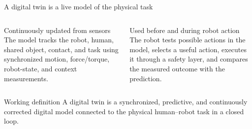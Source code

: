 \documentclass[aspectratio=169,11pt]{beamer}
\begin{document}
\begin{frame}{A digital twin is a live model of the physical task}
\begin{columns}[T,onlytextwidth]
\begin{block}{Continuously updated from sensors}
The model tracks the robot, human, shared object, contact, and task using synchronized motion, force/torque, robot-state, and context measurements.
\end{block}
\begin{block}{Used before and during robot action}
The robot tests possible actions in the model, selects a useful action, executes it through a safety layer, and compares the measured outcome with the prediction.
\end{block}
\end{columns}
\vspace{0.28cm}
\begin{alertblock}{Working definition}
A digital twin is a synchronized, predictive, and continuously corrected digital model connected to the physical human--robot task in a closed loop.
\end{alertblock}
\end{frame}
\end{document}

